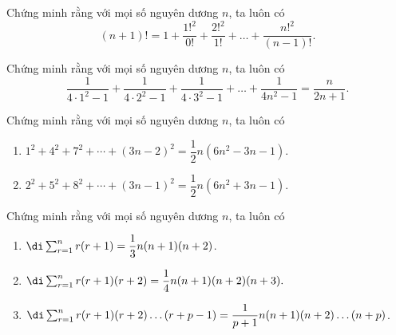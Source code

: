 \begin{bai}
Chứng minh rằng với mọi số nguyên dương $n$, ta luôn có 
\[(n+1) !=1+\dfrac{1 !^{2}}{0 !}+\dfrac{2 !^{2}}{1 !}+\ldots+\dfrac{n !^{2}}{(n-1) !}.\]
\end{bai}
\begin{bai}
Chứng minh rằng với mọi số nguyên dương $n$, ta luôn có 
\[\dfrac{1}{4\cdot1^{2}-1}+\dfrac{1}{4\cdot2^{2}-1}+\dfrac{1}{4\cdot3^{2}-1}+\ldots+\dfrac{1}{4 n^{2}-1}=\dfrac{n}{2 n+1}.\]
\end{bai}
\begin{bai}
Chứng minh rằng với mọi số nguyên dương $n$, ta luôn có 
\begin{enumerate}[a,]
    \item $1^{2}+4^{2}+7^{2}+\cdots+(3 n-2)^{2}=\dfrac{1}{2} n\left(6 n^{2}-3 n-1\right).$
    \item $2^{2}+5^{2}+8^{2}+\cdots+(3 n-1)^{2}=\dfrac{1}{2} n\left(6 n^{2}+3 n-1\right).$
\end{enumerate}
\end{bai}
\begin{bai}
Chứng minh rằng với mọi số nguyên dương $n$, ta luôn có 
\begin{enumerate}[a,]
    \item $\di \sum_{r=1}^{n} r(r+1)=\dfrac{1}{3} n(n+1)(n+2)$.
    \item $\di \sum_{r=1}^{n} r(r+1)(r+2)=\dfrac{1}{4} n(n+1)(n+2)(n+3).$
    \item $\di \sum_{r=1}^{n} r(r+1)(r+2) \ldots(r+p-1)=\dfrac{1}{p+1} n(n+1)(n+2) \ldots(n+p)$.
\end{enumerate}
\end{bai}


